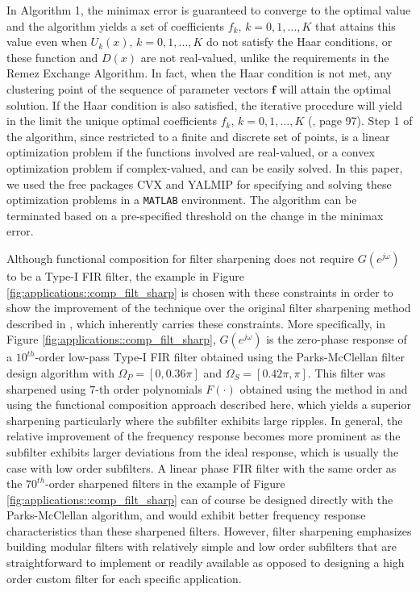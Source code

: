 \documentclass[journal] {IEEEtran}
\begin{document}
In Algorithm 1, the minimax error is guaranteed to converge to the optimal value and the algorithm yields a set of coefficients $f_k,\, k=0,1,\dots,K$ that attains this value even when $U_k(x), \, k=0,1,\dots,K$ do not satisfy the Haar conditions, or these function and $D(x)$ are not real-valued, unlike the requirements in the Remez Exchange Algorithm. In fact, when the Haar condition is not met, any clustering point of the sequence of parameter vectors $\mathbf{f}$ will attain the optimal solution. If the Haar condition is also satisfied, the iterative procedure will yield in the limit the unique optimal coefficients $f_k, \, k=0,1,\dots,K$ (\cite{Cheney1966}, page 97). Step 1 of the algorithm, since restricted to a finite and discrete set of points, is a linear optimization problem if the functions involved are real-valued, or a convex optimization problem if complex-valued, and can be easily solved. In this paper, we used the free packages CVX \cite{cvx,Grant2008} and YALMIP \cite{yalmip} for specifying and solving these optimization problems in a \texttt{MATLAB} environment. The algorithm can be terminated based on a pre-specified threshold on the change in the minimax error.


Although functional composition for filter sharpening does not require $G(e^{j\omega})$ to be a Type-I FIR filter, the example in Figure \ref{fig:applications::comp_filt_sharp} is chosen with these constraints in order to show the improvement of the technique over the original filter sharpening method described in \cite{Kaiser1977}, which inherently carries these constraints. More specifically, in Figure \ref{fig:applications::comp_filt_sharp}, $G(e^{j\omega})$ is the zero-phase response of a $10^{th}$-order low-pass Type-I FIR filter obtained using the Parks-McClellan filter design algorithm with $\Omega_P=[0,0.36\pi]$ and $\Omega_S=[0.42\pi,\pi]$. This filter was sharpened using $7$-th order polynomials $F(\cdot)$ obtained using the method in \cite{Kaiser1977} and using the functional composition approach described here, which yields a superior sharpening particularly where the subfilter exhibits large ripples. In general, the relative improvement of the frequency response becomes more prominent as the subfilter exhibits larger deviations from the ideal response, which is usually the case with low order subfilters. A linear phase FIR filter with the same order as the $70^{th}$-order sharpened filters in the example of Figure \ref{fig:applications::comp_filt_sharp} can of course be designed directly with the Parks-McClellan algorithm, and would exhibit better frequency response characteristics than these sharpened filters. However, filter sharpening emphasizes building modular filters with relatively simple and low order subfilters that are straightforward to implement or readily available as opposed to designing a high order custom filter for each specific application.
\end{document}

